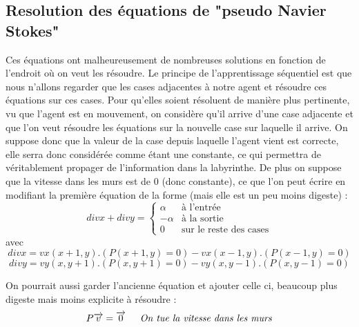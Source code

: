 \documentclass[12pt]{article}
\begin{document}
\subsection{Resolution des équations de "pseudo Navier Stokes"}
Ces équations ont malheureusement de nombreuses solutions en fonction de l'endroit où on veut les résoudre. Le principe de l'apprentissage séquentiel est que nous n'allons regarder que les cases adjacentes à notre agent et résoudre ces équations sur ces cases. Pour qu'elles soient résoluent de manière plus pertinente, vu que l'agent est en mouvement, on considère qu'il arrive d'une case adjacente et que l'on veut résoudre les équations sur la nouvelle case sur laquelle il arrive. On suppose donc que la valeur de la case depuis laquelle l'agent vient est correcte, elle serra donc considérée comme étant une constante, ce qui permettra de véritablement propager de l'information dans la labyrinthe. De plus on suppose que la vitesse dans les murs est de 0 (donc constante), ce que l'on peut écrire en modifiant la première équation de la forme (mais elle est un peu moins digeste) :
\[ divx + divy = 
\begin{cases}
	\alpha & \text{à l'entrée} \\
	-\alpha & \text{à la sortie} \\
	0 & \text{sur le reste des cases}
\end{cases}
\] 
avec 
\[divx = vx(x+1,y).(P(x+1,y)=0) - vx(x-1,y).(P(x-1,y)=0) \]
\[divy = vy(x,y+1).(P(x,y+1)=0) - vy(x,y-1).(P(x,y-1)=0) \]

On pourrait aussi garder l'ancienne équation et ajouter celle ci, beaucoup plus digeste mais moins explicite à résoudre :
\[P\overrightarrow{v} = \overrightarrow{0} \indent\text{\textit{On tue la vitesse dans les murs}}\]
\end{document}
